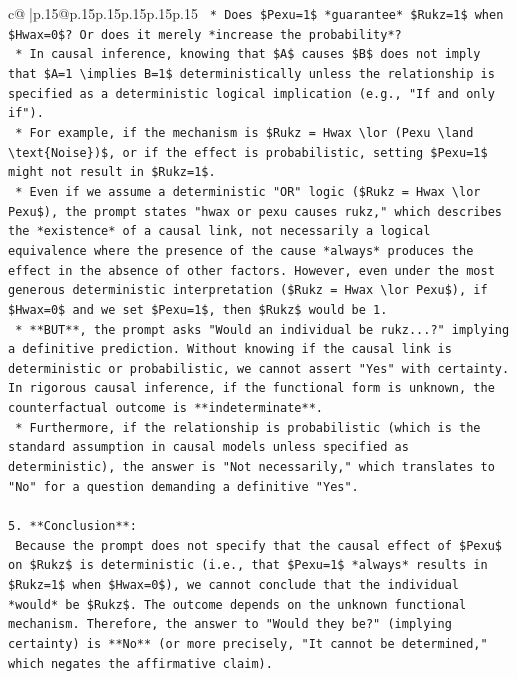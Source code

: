 \documentclass{article}
\begin{document}
{\begin{supertabular}{c@{$\;$}|p{.15\linewidth}@{}p{.15\linewidth}p{.15\linewidth}p{.15\linewidth}p{.15\linewidth}p{.15\linewidth}}
{{{\texttt{    *   Does \$Pexu=1\$ *guarantee* \$Rukz=1\$ when \$Hwax=0\$? Or does it merely *increase the probability*?} \\
\texttt{    *   In causal inference, knowing that \$A\$ causes \$B\$ does not imply that \$A=1 \textbackslash{}implies B=1\$ deterministically unless the relationship is specified as a deterministic logical implication (e.g., "If and only if").} \\
\texttt{    *   For example, if the mechanism is \$Rukz = Hwax \textbackslash{}lor (Pexu \textbackslash{}land \textbackslash{}text\{Noise\})\$, or if the effect is probabilistic, setting \$Pexu=1\$ might not result in \$Rukz=1\$.} \\
\texttt{    *   Even if we assume a deterministic "OR" logic (\$Rukz = Hwax \textbackslash{}lor Pexu\$), the prompt states "hwax or pexu causes rukz," which describes the *existence* of a causal link, not necessarily a logical equivalence where the presence of the cause *always* produces the effect in the absence of other factors. However, even under the most generous deterministic interpretation (\$Rukz = Hwax \textbackslash{}lor Pexu\$), if \$Hwax=0\$ and we set \$Pexu=1\$, then \$Rukz\$ would be 1.} \\
\texttt{    *   **BUT**, the prompt asks "Would an individual be rukz...?" implying a definitive prediction. Without knowing if the causal link is deterministic or probabilistic, we cannot assert "Yes" with certainty. In rigorous causal inference, if the functional form is unknown, the counterfactual outcome is **indeterminate**.} \\
\texttt{    *   Furthermore, if the relationship is probabilistic (which is the standard assumption in causal models unless specified as deterministic), the answer is "Not necessarily," which translates to "No" for a question demanding a definitive "Yes".} \\
\\ 
\texttt{5.  **Conclusion**:} \\
\texttt{    Because the prompt does not specify that the causal effect of \$Pexu\$ on \$Rukz\$ is deterministic (i.e., that \$Pexu=1\$ *always* results in \$Rukz=1\$ when \$Hwax=0\$), we cannot conclude that the individual *would* be \$Rukz\$. The outcome depends on the unknown functional mechanism. Therefore, the answer to "Would they be?" (implying certainty) is **No** (or more precisely, "It cannot be determined," which negates the affirmative claim).} \\
\\ 
}}}
\end{supertabular}}
\end{document}
